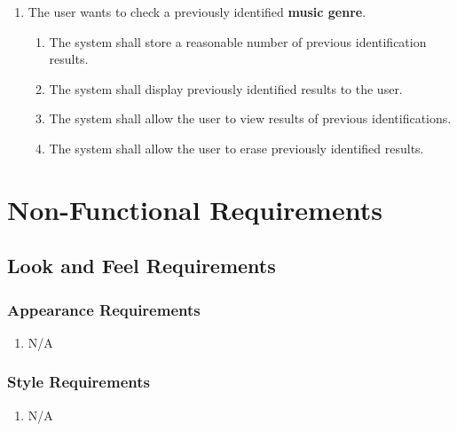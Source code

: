 \documentclass[]{article}
\begin{document}
\begin{enumerate}[{VP}1.]
\begin{enumerate}[{BE1}.1]
		\item The user wants to check a previously identified \textbf{music genre}.
		\begin{enumerate}
			\item The system shall store a reasonable number of previous identification results.
			\item The system shall display previously identified results to the user.
			\item The system shall allow the user to view results of previous identifications.
			\item The system shall allow the user to erase previously identified results.

		\end{enumerate}
	\end{enumerate}
	
\end{enumerate}


\newpage
\section{Non-Functional Requirements}
\label{sec:non-functional_requirements}
\subsection{Look and Feel Requirements}
\label{sub:look_and_feel_requirements}

\subsubsection{Appearance Requirements}
\label{ssub:appearance_requirements}
\begin{enumerate}[{LF}1. ]
	\item N/A
\end{enumerate}

\subsubsection{Style Requirements}
\label{ssub:style_requirements}
\begin{enumerate}[{LF}1. ]
\item N/A
\end{enumerate}

\end{document}
